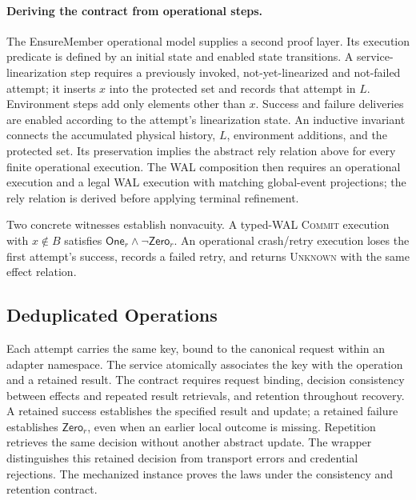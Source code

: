\documentclass[acmsmall,screen,review,anonymous]{acmart}
\newcommand{\Unknown}{\textsc{Unknown}\xspace}
\newcommand{\Commit}{\textsc{Commit}\xspace}
\begin{document}
\paragraph{Deriving the contract from operational steps.}
The EnsureMember operational model supplies a second proof layer. Its
execution predicate is defined by an initial state and enabled state
transitions. A service-linearization step requires a previously invoked,
not-yet-linearized and not-failed attempt; it inserts $x$ into the
protected set and records that attempt in $L$. Environment steps add
only elements other than $x$. Success and failure deliveries are
enabled according to the attempt's linearization state.
An inductive invariant connects the accumulated physical history, $L$,
environment additions, and the protected set. Its preservation implies
the abstract rely relation above for every finite operational execution.
The WAL composition then requires an operational execution and a legal
WAL execution with matching global-event projections; the rely relation
is derived before applying terminal refinement.

Two concrete witnesses establish nonvacuity. A typed-WAL \Commit execution
with $x\notin B$ satisfies $\mathsf{One}_r\land\neg\mathsf{Zero}_r$.
An operational crash/retry execution loses the first attempt's success,
records a failed retry, and returns \Unknown with the same effect relation.


\subsection{Deduplicated Operations}

Each attempt carries the same key, bound to the canonical request
within an adapter namespace. The service atomically associates the key
with the operation and a retained result. The contract requires
request binding, decision consistency between effects and repeated
result retrievals, and retention throughout recovery. A retained success
establishes the specified result and update; a retained failure establishes
$\mathsf{Zero}_r$, even when an earlier local outcome is missing.
Repetition retrieves the same decision without another abstract update.
The wrapper distinguishes this retained decision from transport errors
and credential rejections. The mechanized instance proves the laws under
the consistency and retention contract.
\end{document}
